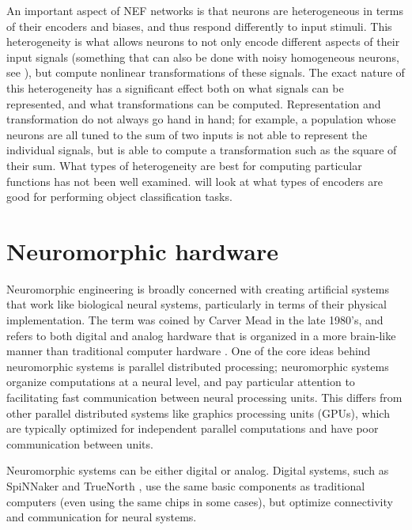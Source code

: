 An important aspect of NEF networks is that neurons are heterogeneous
in terms of their encoders and biases,
and thus respond differently to input stimuli.
This heterogeneity is what allows neurons to not only encode
different aspects of their input signals
(something that can also be done with noisy homogeneous neurons, see \textcite{Hunsberger2014}),
but compute nonlinear transformations of these signals.
The exact nature of this heterogeneity has a significant effect
both on what signals can be represented,
and what transformations can be computed.
Representation and transformation do not always go hand in hand;
for example, a population whose neurons are all tuned to the sum of two inputs
is not able to represent the individual signals,
but is able to compute a transformation such as the square of their sum.
What types of heterogeneity are best for computing particular functions
has not been well examined.
 will look at what types of encoders are good
for performing object classification tasks.


\section{Neuromorphic hardware}

Neuromorphic engineering is broadly concerned with creating artificial systems
that work like biological neural systems,
particularly in terms of their physical implementation.
The term was coined by Carver Mead in the late 1980's,
and refers to both digital and analog hardware
that is organized in a more brain-like manner
than traditional computer hardware \parencite{Mead1990}.
One of the core ideas behind neuromorphic systems
is parallel distributed processing;
neuromorphic systems organize computations at a neural level,
and pay particular attention to facilitating fast communication between
neural processing units.
This differs from other parallel distributed systems
like graphics processing units (GPUs),
which are typically optimized for independent parallel computations
and have poor communication between units.

Neuromorphic systems can be either digital or analog.
Digital systems, such as SpiNNaker \parencite{Furber2013} and TrueNorth \parencite{Merolla2014},
use the same basic components as traditional computers
(even using the same chips in some cases),
but optimize connectivity and communication for neural systems.

